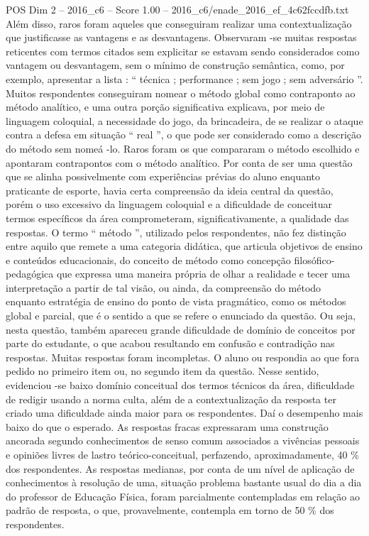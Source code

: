 \begin{textsample}{POS Dim 2 – 2016\_c6 – Score 1.00 – 2016\_c6/enade\_2016\_ef\_4c62fccdfb.txt}
Além disso, raros foram aqueles que conseguiram realizar uma contextualização que justificasse as vantagens e as desvantagens.
Observaram -se muitas respostas reticentes com termos citados sem explicitar se estavam sendo considerados como vantagem ou desvantagem, sem o mínimo de construção semântica, como, por exemplo, apresentar a lista : “ técnica ; performance ; sem jogo ; sem adversário ”.
Muitos respondentes conseguiram nomear o método global como contraponto ao método analítico, e uma outra porção significativa explicava, por meio de linguagem coloquial, a necessidade do jogo, da brincadeira, de se realizar o ataque contra a defesa em situação “ real ”, o que pode ser considerado como a descrição do método sem nomeá -lo.
Raros foram os que compararam o método escolhido e apontaram contrapontos com o método analítico.
Por conta de ser uma questão que se alinha possivelmente com experiências prévias do aluno enquanto praticante de esporte, havia certa compreensão da ideia central da questão, porém o uso excessivo da linguagem coloquial e a dificuldade de conceituar termos específicos da área comprometeram, significativamente, a qualidade das respostas.
O termo “ método ”, utilizado pelos respondentes, não fez distinção entre aquilo que remete a uma categoria didática, que articula objetivos de ensino e conteúdos educacionais, do conceito de método como concepção filosófico-pedagógica que expressa uma maneira própria de olhar a realidade e tecer uma interpretação a partir de tal visão, ou ainda, da compreensão do método enquanto estratégia de ensino do ponto de vista pragmático, como os métodos global e parcial, que é o sentido a que se refere o enunciado da questão.
Ou seja, nesta questão, também apareceu grande dificuldade de domínio de conceitos por parte do estudante, o que acabou resultando em confusão e contradição nas respostas.
Muitas respostas foram incompletas.
O aluno ou respondia ao que fora pedido no primeiro item ou, no segundo item da questão.
Nesse sentido, evidenciou -se baixo domínio conceitual dos termos técnicos da área, dificuldade de redigir usando a norma culta, além de a contextualização da resposta ter criado uma dificuldade ainda maior para os respondentes.
Daí o desempenho mais baixo do que o esperado.
As respostas fracas expressaram uma construção ancorada segundo conhecimentos de senso comum associados a vivências pessoais e opiniões livres de lastro teórico-conceitual, perfazendo, aproximadamente, 40 \% dos respondentes.
As respostas medianas, por conta de um nível de aplicação de conhecimentos à resolução de uma, situação problema bastante usual do dia a dia do professor de Educação Física, foram parcialmente contempladas em relação ao padrão de resposta, o que, provavelmente, contempla em torno de 50 \% dos respondentes.

\end{textsample}
